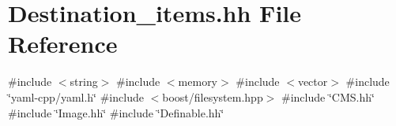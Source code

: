 \hypertarget{_destination__items_8hh}{}\section{Destination\+\_\+items.\+hh File Reference}
\label{_destination__items_8hh}
{\ttfamily \#include $<$string$>$}\newline
{\ttfamily \#include $<$memory$>$}\newline
{\ttfamily \#include $<$vector$>$}\newline
{\ttfamily \#include \char`\"{}yaml-\/cpp/yaml.\+h\char`\"{}}\newline
{\ttfamily \#include $<$boost/filesystem.\+hpp$>$}\newline
{\ttfamily \#include \char`\"{}C\+M\+S.\+hh\char`\"{}}\newline
{\ttfamily \#include \char`\"{}Image.\+hh\char`\"{}}\newline
{\ttfamily \#include \char`\"{}Definable.\+hh\char`\"{}}\newline
